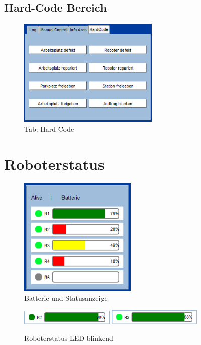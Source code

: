 \subsection{Hard-Code Bereich}
\label{sec:HardCode}

\begin{figure}[htb]
    \centering
    \includegraphics[width=0.6\textwidth]{Abbildungen/HardCode.png}
    \caption{Tab: Hard-Code}		
    \label{fig:HardCode}
\end{figure}

\section{Roboterstatus}

\begin{figure}[htb]
    \centering
    \includegraphics[width=0.5\textwidth]{Abbildungen/Batterie.png}
    \caption{Batterie und Statusanzeige}		
    \label{fig:Batterie}
\end{figure}

\begin{figure}[htb]
    \centering
    \includegraphics[width=0.4\textwidth]{Abbildungen/BatterieAlive1.png}
    \includegraphics[width=0.4\textwidth]{Abbildungen/BatterieAlive2.png}
    \caption{Roboterstatus-LED blinkend}		
    \label{fig:Led}
\end{figure}


